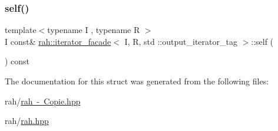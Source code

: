 \subsubsection{\texorpdfstring{self()}{self()}\hspace{0.1cm}{\footnotesize\ttfamily [4/4]}}
{\footnotesize\ttfamily template$<$typename I , typename R $>$ \\
I const\& \mbox{\hyperlink{structrah_1_1iterator__facade}{rah\+::iterator\+\_\+facade}}$<$ I, R, std \+::output\+\_\+iterator\+\_\+tag $>$\+::self (\begin{DoxyParamCaption}{ }\end{DoxyParamCaption}) const\hspace{0.3cm}{\ttfamily [inline]}}



The documentation for this struct was generated from the following files\+:\begin{DoxyCompactItemize}
\item 
rah/\mbox{\hyperlink{rah_01-_01_copie_8hpp}{rah -\/ Copie.\+hpp}}\item 
rah/\mbox{\hyperlink{rah_8hpp}{rah.\+hpp}}\end{DoxyCompactItemize}
